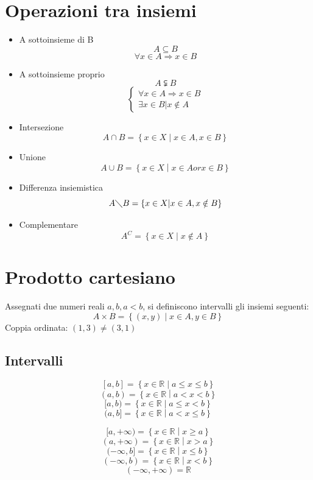 \documentclass[11pt,a4paper,notitlepage]{report}
\let\numberset\mathbb
\newcommand{\R}{\numberset{R}}
\begin{document}
\section{Operazioni tra insiemi}
\begin{itemize}
	\item A sottoinsieme di B
		\[A \subseteq  B\]
		\[\forall x \in A \Rightarrow x \in B\]
	\item A sottoinsieme proprio
		\[A \subsetneqq  B\]
		\[
			\begin{cases}
				\forall x \in A \Rightarrow x \in B \\
				\exists x \in B | x \notin A
  			\end{cases}
  		\]
  	\item Intersezione
  		\[A \cap B = \left\{ x \in X \middle| x \in A, x \in B\right\}\]
  	\item Unione
  		\[A \cup B = \left\{ x \in X \middle| x \in A or x \in B\right\}\]
  	\item Differenza insiemistica
  		\[A \diagdown B = \left\{ x \in X \middle| x \in A, x \notin B\right\}\]
  	\item Complementare
  		\[A^C = \left\{ x \in X \middle| x \notin A \right\}\]
\end{itemize}

\section{Prodotto cartesiano}
Assegnati due numeri reali $a, b, a < b$, si definiscono intervalli gli insiemi seguenti:
\[A\times B = \left\{ (x,y) \middle| x\in A, y\in B\right\}\]
Coppia ordinata: $(1,3) \neq (3,1)$
\subsection{Intervalli}
\[[a,b] = \left\{ x\in \R \middle| a \leq x \leq b \right\}\]
\[(a,b) = \left\{ x\in \R \middle| a < x < b \right\}\]
\[[a,b) = \left\{ x\in \R \middle| a \leq x < b \right\}\]
\[(a,b] = \left\{ x\in \R \middle| a < x \leq b \right\}\]

\[[a,+\infty) = \left\{ x\in \R \middle| x \geq a \right\}\]
\[(a,+\infty) = \left\{ x\in \R \middle| x > a \right\}\]
\[(-\infty,b] = \left\{ x\in \R \middle| x \leq b \right\}\]
\[(-\infty,b) = \left\{ x\in \R \middle| x < b \right\}\]
\[(-\infty,+\infty) = \R\]
\end{document}
